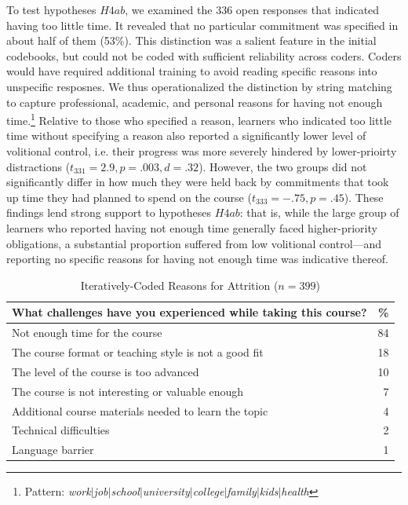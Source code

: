 \documentclass{sigchi}\usepackage[]{graphicx}\usepackage[]{color}
\begin{document}
To test hypotheses $H4ab$, we examined the 336 open responses that indicated having too little time. It revealed that no particular commitment was specified in about half of them (53\%). This distinction was a salient feature in the initial codebooks, but could not be coded with sufficient reliability across coders. Coders would have required additional training to avoid reading specific reasons into unspecific resposnes. We thus operationalized the distinction by string matching to capture professional, academic, and personal reasons for having not enough time.\footnote{Pattern: {\em work$|$job$|$school$|$university$|$college$|$family$|$kids$|$health}} Relative to those who specified a reason, learners who indicated too little time without specifying a reason also reported a significantly lower level of volitional control, i.e. their progress was more severely hindered by lower-prioirty distractions ($t_{331}=2.9, p=.003, d=.32$). However, the two groups did not significantly differ in how much they were held back by commitments that took up time they had planned to spend on the course ($t_{333}=-.75, p=.45$). These findings lend strong support to hypotheses $H4ab$: that is, while the large group of learners who reported having not enough time generally faced higher-priority obligations, a substantial proportion suffered from low volitional control---and reporting no specific reasons for having not enough time was indicative thereof.

\begin{table}[h!]
\caption{Iteratively-Coded Reasons for Attrition ($n=399$)}
\label{tab:s2reas}
\small
\center
\begin{tabular}{lr}
\toprule
What challenges have you experienced while taking this course?  & \% \\
\midrule
Not enough time for the course & 84 \\
The course format or teaching style is not a good fit & 18 \\
The level of the course is too advanced & 10 \\
The course is not interesting or valuable enough & 7 \\
Additional course materials needed to learn the topic & 4 \\
Technical difficulties & 2 \\
Language barrier & 1 \\
\bottomrule
\end{tabular}
\end{table}
\end{document}
